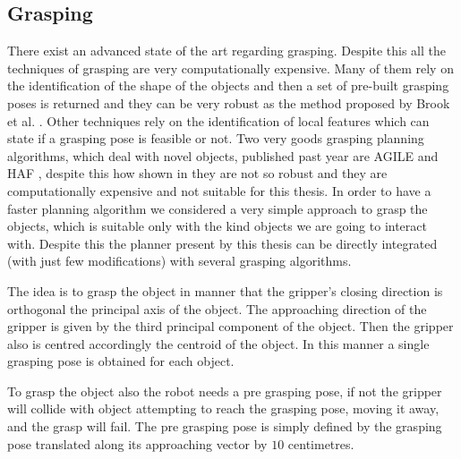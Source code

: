 
\subsection{Grasping}
\label{sec:grasping}

There exist an advanced state of the art regarding grasping. Despite this all the techniques of grasping are very computationally expensive. Many of them rely on the identification of the shape of the objects and then a set of pre-built grasping poses is returned and they can be very robust as the method proposed by Brook et al. \citep{brook2011collaborative}. Other techniques rely on the identification of local features which can state if a grasping pose is feasible or not. Two very goods grasping planning algorithms, which deal with novel objects, published past year are AGILE \citep{AGILE} and HAF \citep{haf}, despite this how shown in \citep{covallero} they are not so robust and they are computationally expensive and not suitable for this thesis. In order to have a faster planning algorithm we considered a very simple approach to grasp the objects, which is suitable only with the kind objects we are going to interact with. Despite this the planner present by this thesis can be directly integrated (with just few modifications) with several grasping algorithms. 

The idea is to grasp the object in manner that the gripper's closing direction is orthogonal the principal axis of the object. The approaching direction of the gripper is given by the third principal component of the object. Then the gripper also is centred accordingly the centroid of the object. 
In this manner a single grasping pose is obtained for each object. 


To grasp the object also the robot needs a pre grasping pose, if not the gripper will collide with object attempting to reach the grasping pose, moving it away, and the grasp will fail. The pre grasping pose is simply defined by the grasping pose translated along its approaching vector by $10$ centimetres.

